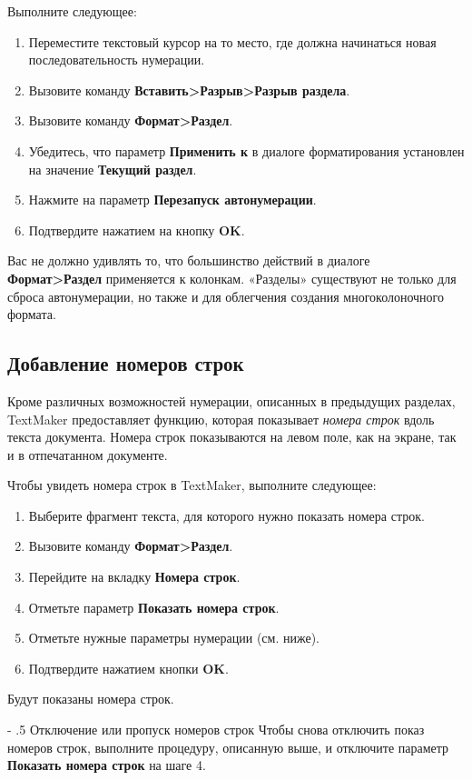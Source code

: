 \documentclass[a4paper,10pt]{article}
\makeatletter
\renewcommand\paragraph{%
   \@startsection{paragraph}{4}{0mm}%
      {-\baselineskip}%
      {.5\baselineskip}%
      {\normalfont\normalsize\bfseries}}
\makeatother
\begin{document}
Выполните следующее:
\begin{enumerate}
 \item Переместите текстовый курсор на то место, где должна начинаться новая последовательность нумерации.
 \item Вызовите команду \textbf{Вставить>Разрыв>Разрыв раздела}.
 \item Вызовите команду \textbf{Формат>Раздел}.
 \item Убедитесь, что параметр \textbf{Применить к} в диалоге форматирования установлен на значение \textbf{Текущий раздел}.
 \item Нажмите на параметр \textbf{Перезапуск автонумерации}.
 \item Подтвердите нажатием на кнопку \textbf{OK}.
\end{enumerate}

Вас не должно удивлять то, что большинство действий в диалоге \textbf{Формат>Раздел} применяется к колонкам. «Разделы» существуют не только для сброса автонумерации, но также и для облегчения создания многоколоночного формата.

\subsection{Добавление номеров строк}
Кроме различных возможностей нумерации, описанных в предыдущих разделах, TextMaker предоставляет функцию, которая показывает \textit{номера строк} вдоль текста документа. Номера строк показываются на левом поле, как на экране, так и в отпечатанном документе.

Чтобы увидеть номера строк в TextMaker, выполните следующее:
\begin{enumerate}
 \item Выберите фрагмент текста, для которого нужно показать номера строк.
 \item Вызовите команду \textbf{Формат>Раздел}.
 \item Перейдите на вкладку \textbf{Номера строк}.
 \item Отметьте параметр \textbf{Показать номера строк}.
 \item Отметьте нужные параметры нумерации (см. ниже).
 \item Подтвердите нажатием кнопки \textbf{OK}.
\end{enumerate}

Будут показаны номера строк.

\paragraph{Отключение или пропуск номеров строк}
Чтобы снова отключить показ номеров строк, выполните процедуру, описанную выше, и отключите параметр \textbf{Показать номера строк} на шаге 4.
\end{document}
